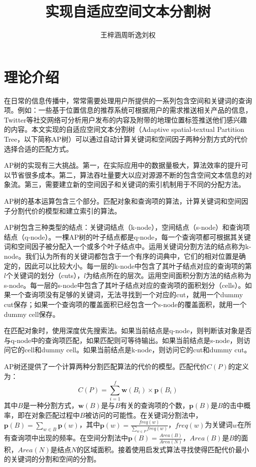\documentclass[UTF8]{ctexart}
\title{实现自适应空间文本分割树}
\author{王梓涵\quad 周昕逸\quad 刘权}
\date{}
\begin{document}
\maketitle

\linespread{0.5}
\setlength{\parskip}{0.5\baselineskip}

\section{理论介绍}

在日常的信息传播中，常常需要处理用户所提供的一系列包含空间和关键词的查询项。例如：一些基于位置信息的推荐系统可根据用户的需求推送相关产品的信息，Twitter等社交网络可分析用户发布的内容及附带的地理位置标签推送他们感兴趣的内容。本文实现的自适应空间文本分割树（Adaptive spatial-textual Partition Tree，以下简称AP树）可以通过自动计算关键词和空间因子两种分割方式的代价选择合适的匹配方式。

AP树的实现有三大挑战。第一，在实际应用中的数据量极大，算法效率的提升可以节省很多成本。第二，算法吞吐量要大以应对源源不断的包含空间文本信息的对象流。第三，需要建立新的空间因子和关键词的索引机制用于不同的分配方法。

AP树的基本运算包含三个部分。匹配对象和查询项的算法，计算关键词和空间因子分割代价的模型和建立索引的算法。

AP树包含三种类型的结点：关键词结点（k-node），空间结点（s-node）和查询项结点（q-node）。一棵AP树的叶子结点都是q-node，每一个查询项都可根据其关键词和空间因子被分配入一个或多个叶子结点中。运用关键词分割方法的结点称为k-node。我们认为所有的关键词都包含于一个有序的词典中，它们的相对位置是确定的，因此可以比较大小。每一层的k-node中包含了其叶子结点对应的查询项的第$l$个关键词的划分（cuts），$l$为结点所在的层次。运用空间面积分割方法的结点称为s-node。每一层的s-node中包含了其叶子结点对应的查询项的面积划分（cells）。如果一个查询项没有足够的关键词，无法寻找到一个对应的cut，就用一个dummy cut保存；如果一个查询项的覆盖面积已经包含一个s-node的覆盖面积，就用一个dummy cell保存。

在匹配对象时，使用深度优先搜索法。如果当前结点是q-node，则判断该对象是否与q-node中的查询项匹配，如果匹配则可等待输出。如果当前结点是s-node，则访问它的cell和dummy cell。如果当前结点是k-node，则访问它的cut和dummy cut。

AP树还提供了一个计算两种分割匹配算法的代价的模型。匹配代价$C(P)$的定义为：
\[C(P)=\sum_{i=1}^f \mathbf{w}(B_i)\times \mathbf{p}(B_i)\]
其中$B$是一种分割方式，$\mathbf{w}(B)$是与$B$有关的查询项的个数，$\mathbf{p}(B)$是$B$的击中概率，即在对象匹配过程中$B$被访问的可能性。在关键词分割法中，$\mathbf{p}(B)=\sum_{w\in B} \mathbf{p}(w)$，其中$\mathbf{p}(w)=\frac{freq(w)}{\sum_{w\in P}freq(w)}$，$freq(w)$为关键词$w$在所有查询项中出现的频率。在空间分割法中$\mathbf{p}(B)=\frac{Area(B)}{Area(N)}$，$Area(B)$是$B$的面积，$Area(N)$是结点$N$的区域面积。接着使用启发式算法寻找使得匹配代价最小的关键词的分割和空间的分割。
\end{document}
